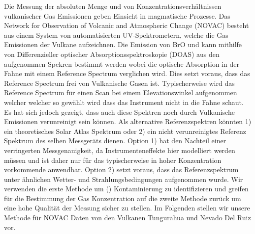 

Die Messung der absoluten Menge und von Konzentrationsverhältnissen vulkanischer Gas Emissionen geben Einsicht in magmatische Prozesse. Das Network for Observation of Volcanic and Atmospheric Change (NOVAC) besteht aus einem System von automatisierten UV-Spektrometern, welche die Gas Emissionen der Vulkane aufzeichnen. Die Emission von BrO und  kann mithilfe von Differenzieller optischer Absorptionsspektroskopie (DOAS) aus den aufgenommen Spekren bestimmt werden wobei die optische Absorption in der Fahne mit einem Reference Spectrum verglichen wird. Dies setzt voraus, dass das Reference Spectrum frei von Vulkanische Gasen ist. Typischerweise wird das Reference Spectrum für einen Scan bei einem Elevationswinkel aufgenommen welcher welcher so gewählt wird dass das Instrument nicht in die Fahne schaut. Es hat sich jedoch gezeigt, dass auch diese Spektren noch durch Vulkanische Emissionen verunreinigt sein können. Als alternative Referenzspektren könnten 1) ein theoretisches Solar Atlas Spektrum oder 2) ein nicht verunreinigtes Referenz Spektrum des selben Messgeräts dienen. Option 1) hat den Nachteil einer verringerten Messgenauigkeit, da Instrumenteneffekte hier modelliert werden müssen und ist daher nur für das typischerweise in hoher Konzentration vorkommende  anwendbar. Option 2) setzt voraus, dass das Referenzspektrum unter ähnlichen Wetter- und Strahlungsbedingungen aufgenommen wurde. Wir verwenden die erste Methode um () Kontaminierung zu identifizieren und greifen für die Bestimmung der Gas Konzentration auf die zweite Methode zurück um eine hohe Qualität der Messung sicher zu stellen. Im Folgenden stellen wir unsere Methode für NOVAC Daten von den Vulkanen Tungurahua und Nevado Del Ruiz vor.